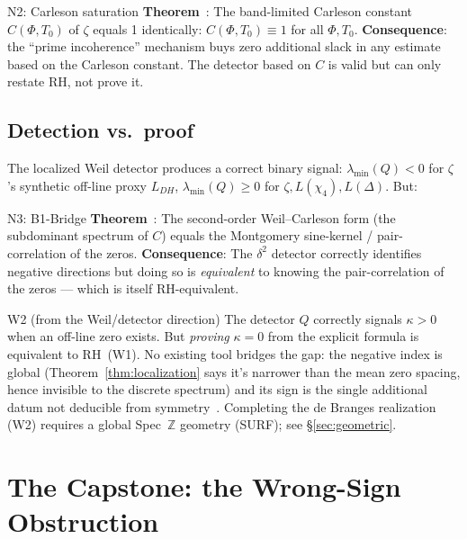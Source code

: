 \documentclass[11pt]{amsart}
\theoremstyle{definition}
\theoremstyle{remark}
\newcommand{\kap}{\kappa}
\begin{document}
\begin{nogobox}{N2: Carleson saturation}
\textbf{Theorem}~\cite{RP11}: The band-limited Carleson constant $C(\Phi,T_0)$ of
$\zeta$ equals 1 identically: $C(\Phi,T_0) \equiv 1$ for all $\Phi, T_0$.
\textbf{Consequence}: the ``prime incoherence'' mechanism buys zero additional slack
in any estimate based on the Carleson constant.  The detector based on $C$ is valid
but can only restate RH, not prove it.
\end{nogobox}

\subsection{Detection vs.\ proof}

The localized Weil detector produces a correct binary signal: $\lambda_{\min}(Q) < 0$
for $\zeta$'s synthetic off-line proxy $L_{DH}$, $\lambda_{\min}(Q) \ge 0$ for
$\zeta, L(\chi_4), L(\Delta)$.  But:

\begin{nogobox}{N3: B1-Bridge}
\textbf{Theorem}~\cite{RP11}: The second-order Weil--Carleson form (the subdominant
spectrum of $C$) equals the Montgomery sine-kernel / pair-correlation of the zeros.
\textbf{Consequence}: The $\delta^2$ detector correctly identifies negative directions
but doing so is \emph{equivalent} to knowing the pair-correlation of the zeros ---
which is itself RH-equivalent.
\end{nogobox}

\begin{wallbox}{W2 (from the Weil/detector direction)}
The detector $Q$ correctly signals $\kap>0$ when an off-line zero exists.
But \emph{proving} $\kap=0$ from the explicit formula is equivalent to RH~(W1).
No existing tool bridges the gap: the negative index is global (Theorem~\ref{thm:localization}
says it's narrower than the mean zero spacing, hence invisible to the discrete spectrum)
and its sign is the single additional datum not deducible from symmetry~\cite{RP25}.
Completing the de Branges realization (W2) requires a global Spec~$\mathbb{Z}$ geometry
(SURF); see \S\ref{sec:geometric}.
\end{wallbox}

\section{The Capstone: the Wrong-Sign Obstruction}
\label{sec:capstone}
\end{document}
